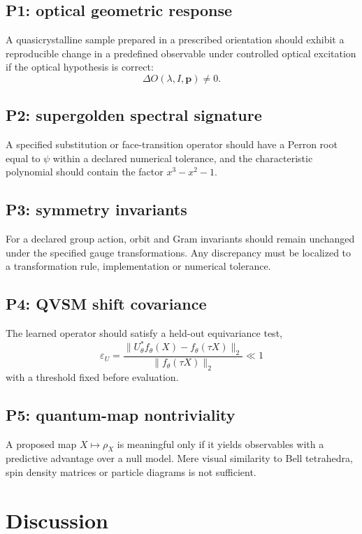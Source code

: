 \documentclass[11pt,a4paper]{article}
\numberwithin{equation}{section}
\begin{document}
\subsection{P1: optical geometric response}
A quasicrystalline sample prepared in a prescribed orientation should exhibit a reproducible change in a predefined observable under controlled optical excitation if the optical hypothesis is correct:
\[
\Delta O(\lambda,I,\mathbf p)\ne0.
\]

\subsection{P2: supergolden spectral signature}
A specified substitution or face-transition operator should have a Perron root equal to $\psi$ within a declared numerical tolerance, and the characteristic polynomial should contain the factor $x^3-x^2-1$.

\subsection{P3: symmetry invariants}
For a declared group action, orbit and Gram invariants should remain unchanged under the specified gauge transformations. Any discrepancy must be localized to a transformation rule, implementation or numerical tolerance.

\subsection{P4: QVSM shift covariance}
The learned operator should satisfy a held-out equivariance test,
\begin{equation}
\varepsilon_U=
\frac{\|U_\theta^* f_\theta(X)-f_\theta(\tau X)\|_2}
{\|f_\theta(\tau X)\|_2}
\ll1
\end{equation}
with a threshold fixed before evaluation.

\subsection{P5: quantum-map nontriviality}
A proposed map $X\mapsto\rho_X$ is meaningful only if it yields observables with a predictive advantage over a null model. Mere visual similarity to Bell tetrahedra, spin density matrices or particle diagrams is not sufficient.

\section{Discussion}
\label{sec:discussion}
\end{document}
